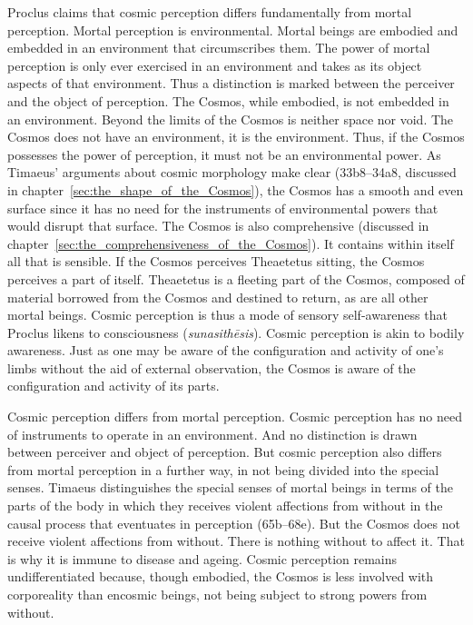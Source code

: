 Proclus claims that cosmic perception differs fundamentally from mortal perception. Mortal perception is environmental. Mortal beings are embodied and embedded in an environment that circumscribes them. The power of mortal perception is only ever exercised in an environment and takes as its object aspects of that environment. Thus a distinction is marked between the perceiver and the object of perception. The Cosmos, while embodied, is not embedded in an environment. Beyond the limits of the Cosmos is neither space nor void. The Cosmos does not have an environment, it is the environment. Thus, if the Cosmos possesses the power of perception, it must not be an environmental power. As Timaeus' arguments about cosmic morphology make clear (33b8–34a8, discussed in chapter~\ref{sec:the_shape_of_the_Cosmos}), the Cosmos has a smooth and even surface since it has no need for the instruments of environmental powers that would disrupt that surface. The Cosmos is also comprehensive (discussed in chapter~\ref{sec:the_comprehensiveness_of_the_Cosmos}). It contains within itself all that is sensible. If the Cosmos perceives Theaetetus sitting, the Cosmos perceives a part of itself. Theaetetus is a fleeting part of the Cosmos, composed of material borrowed from the Cosmos and destined to return, as are all other mortal beings. Cosmic perception is thus a mode of sensory self-awareness that Proclus likens to consciousness (\emph{sunasithēsis}). Cosmic perception is akin to bodily awareness. Just as one may be aware of the configuration and activity of one's limbs without the aid of external observation, the Cosmos is aware of the configuration and activity of its parts. 

Cosmic perception differs from mortal perception. Cosmic perception has no need of instruments to operate in an environment. And no distinction is drawn between perceiver and object of perception. But cosmic perception also differs from mortal perception in a further way, in not being divided into the special senses. Timaeus distinguishes the special senses of mortal beings in terms of the parts of the body in which they receives violent affections from without in the causal process that eventuates in perception (65b–68e). But the Cosmos does not receive violent affections from without. There is nothing without to affect it. That is why it is immune to disease and ageing. Cosmic perception remains undifferentiated because, though embodied, the Cosmos is less involved with corporeality than encosmic beings, not being subject to strong powers from without. 


